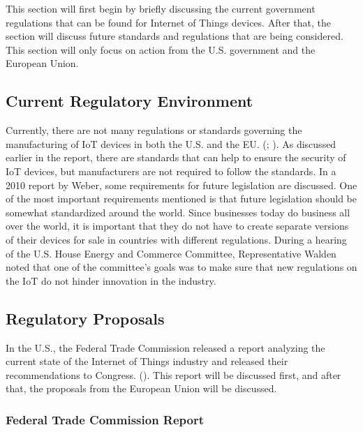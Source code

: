 \documentclass[letterpaper, 12pt]{article}
\begin{document}
\begin{flushleft}
This section will first begin by briefly discussing the current government regulations that can be found for Internet of Things devices. After that,
the section will discuss future standards and regulations that are being considered. This section will only focus on action from the U.S. government and the European Union.

\subsection*{Current Regulatory Environment}

Currently, there are not many regulations or standards governing the manufacturing of IoT devices in both the U.S. and the EU. (\cite{Weber201023}; \cite{housecyberattacks}).  As discussed earlier in the report, there are standards that can help to ensure the security of IoT devices, but manufacturers are
not required to follow the standards. In a 2010 report by Weber, some requirements for future legislation are discussed. One of the most important 
requirements mentioned is that future legislation should be somewhat standardized around the world. Since businesses today do business all over the world,
it is important that they do not have to create separate versions of their devices for sale in countries with different regulations. During a hearing of the
U.S. House Energy and Commerce Committee, Representative Walden noted that one of the committee's goals was to make sure that new regulations on the IoT do not hinder innovation in the industry. 

\subsection*{Regulatory Proposals}

In the U.S., the Federal Trade Commission released a report analyzing the current state of the Internet of Things industry and released their recommendations
to Congress. (\cite{ftc}). This report will be discussed first, and after that, the proposals from the European Union will be discussed.

\subsubsection*{Federal Trade Commission Report}


\end{flushleft}
\end{document}
